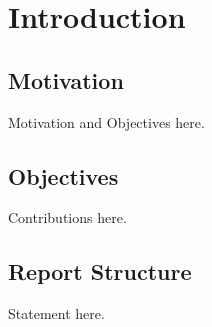 
\chapter{Introduction}

\section{Motivation}

Motivation and Objectives here.



\section{Objectives}

Contributions here.


\section{Report Structure}

Statement here.

